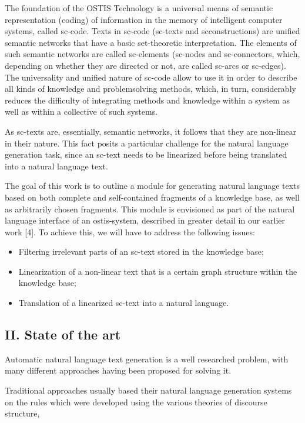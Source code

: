 \documentclass[9pt, a4paper]{article}
\begin{document}
\hspace{4mm}
\begin{minipage}{0.46\textwidth}
\parindent 2mm
\vspace{-10mm}
The foundation of the OSTIS Technology is a universal means of semantic representation (coding) of
information in the memory of intelligent computer systems, called sc-code. Texts in sc-code (sc-texts and scconstructions) are unified semantic networks that have a
basic set-theoretic interpretation. The elements of such
semantic networks are called sc-elements (sc-nodes and
sc-connectors, which, depending on whether they are
directed or not, are called sc-arcs or sc-edges). The
universality and unified nature of sc-code allow to use it
in order to describe all kinds of knowledge and problemsolving methods, which, in turn, considerably reduces the
difficulty of integrating methods and knowledge within a
system as well as within a collective of such systems.


As sc-texts are, essentially, semantic networks, it follows that they are non-linear in their nature. This fact
posits a particular challenge for the natural language
generation task, since an sc-text needs to be linearized
before being translated into a natural language text.


The goal of this work is to outline a module for
generating natural language texts based on both complete
and self-contained fragments of a knowledge base, as
well as arbitrarily chosen fragments. This module is
envisioned as part of the natural language interface of
an ostis-system, described in greater detail in our earlier
work [4]. To achieve this, we will have to address the
following issues:
\begin{itemize}
  \item Filtering irrelevant parts of an sc-text stored in the
knowledge base;
  \item Linearization of a non-linear text that is a certain
graph structure within the knowledge base;
   \item Translation of a linearized sc-text into a natural
language.
\end{itemize}
\begin{center}
  \section*{\small{II. State of the art}}
\end{center}
Automatic natural language text generation is a well researched problem, with many different approaches having been proposed for solving it.



Traditional approaches usually based their natural language generation systems on the rules which were developed using the various theories of discourse structure,
\end{minipage}
\end{document}
